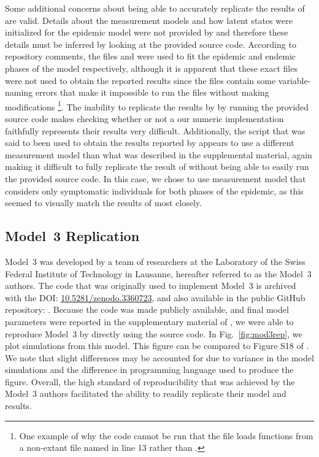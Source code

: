 Some additional concerns about being able to accurately replicate the results of \citet{lee20} are valid.
Details about the measurement models and how latent states were initialized for the epidemic model were not provided by \citet{lee20} and therefore these details must be inferred by looking at the provided source code.
According to repository comments, the files  and  were used to fit the epidemic and endemic phases of the model respectively, although it is apparent that these exact files were not used to obtain the reported results since the files contain some variable-naming errors that make it impossible to run the files without making modifications \footnote{One example of why the code cannot be run that the file loads functions from a non-extant file named  in line 13 rather than .}.
The inability to replicate the results by \citet{lee20} by running the provided source code makes checking whether or not a our numeric implementation faithfully represents their results very difficult.
Additionally, the script that was said to been used to obtain the results reported by \citet{lee20} appears to use a different measurement model than what was described in the supplemental material, again making it difficult to fully replicate the result of \citet{lee20} without being able to easily run the provided source code.
In this case, we chose to use measurement model that considers only symptomatic individuals for both phases of the epidemic, as this seemed to visually match the results of \citet{lee20} most closely.

\subsection{Model~3 Replication}

Model~3 was developed by a team of researchers at the Laboratory of the Swiss Federal Institute of Technology in Lausanne, hereafter referred to as the Model~3 authors.
The code that was originally used to implement Model~3 is archived with the DOI: \url{10.5281/zenodo.3360723}, and also available in the public GitHub repository: .
Because the code was made publicly available, and final model parameters were reported in the supplementary material of \citet{lee20}, we were able to reproduce Model~3 by directly using the source code.
In Fig.~\ref{fig:mod3rep}, we plot simulations from this model.
This figure can be compared to Figure S18 of \citet{lee20}.
We note that slight differences may be accounted for due to variance in the model simulations and the difference in programming language used to produce the figure.
Overall, the high standard of reproducibility that was achieved by the Model~3 authors facilitated the ability to readily replicate their model and results.



